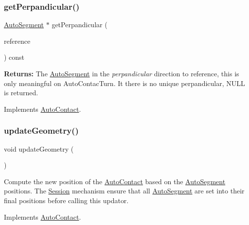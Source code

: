 \subsubsection{\texorpdfstring{get\+Perpandicular()}{getPerpandicular()}}
{\footnotesize\ttfamily \mbox{\hyperlink{classKatabatic_1_1AutoSegment}{Auto\+Segment}} $\ast$ get\+Perpandicular (\begin{DoxyParamCaption}\item[{const \mbox{\hyperlink{classKatabatic_1_1AutoSegment}{Auto\+Segment}} $\ast$}]{reference }\end{DoxyParamCaption}) const\hspace{0.3cm}{\ttfamily [virtual]}}

{\bfseries Returns\+:} The \mbox{\hyperlink{classKatabatic_1_1AutoSegment}{Auto\+Segment}} in the {\itshape perpandicular} direction to {\ttfamily reference}, this is only meaningful on Auto\+Contac\+Turn. It there is no unique perpandicular, {\ttfamily N\+U\+LL} is returned. 

Implements \mbox{\hyperlink{classKatabatic_1_1AutoContact_a994371005874f946cc0ac78005d38423}{Auto\+Contact}}.

\mbox{\label{classKatabatic_1_1AutoContactTerminal_a3e218f6934c51380fb15d0e2bd380071}} 
\subsubsection{\texorpdfstring{update\+Geometry()}{updateGeometry()}}
{\footnotesize\ttfamily void update\+Geometry (\begin{DoxyParamCaption}{ }\end{DoxyParamCaption})\hspace{0.3cm}{\ttfamily [virtual]}}

Compute the new position of the \mbox{\hyperlink{classKatabatic_1_1AutoContact}{Auto\+Contact}} based on the \mbox{\hyperlink{classKatabatic_1_1AutoSegment}{Auto\+Segment}} positions. The \mbox{\hyperlink{classKatabatic_1_1Session}{Session}} mechanism ensure that all \mbox{\hyperlink{classKatabatic_1_1AutoSegment}{Auto\+Segment}} are set into their final positions before calling this updator. 

Implements \mbox{\hyperlink{classKatabatic_1_1AutoContact_af6a2454547eeb7f5a519970dcb467e90}{Auto\+Contact}}.



